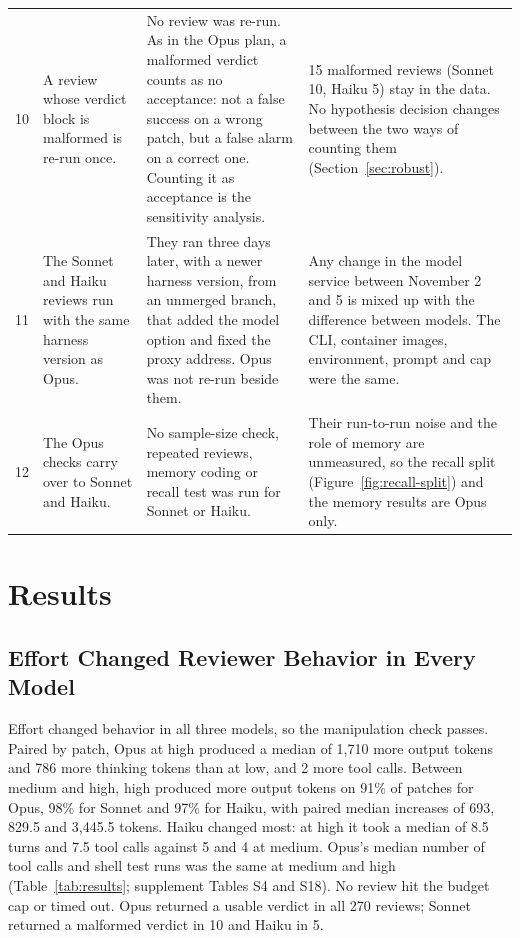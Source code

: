 \documentclass[sigconf,nonacm]{acmart}
\begin{document}
\begin{table}[t]
\begin{tabular}{@{}r L{0.26\textwidth} L{0.33\textwidth} L{0.32\textwidth}@{}}
10 & A review whose verdict block is malformed is re-run once. & No review was re-run. As in the Opus plan, a malformed verdict counts as no acceptance: not a false success on a wrong patch, but a false alarm on a correct one. Counting it as acceptance is the sensitivity analysis. & 15 malformed reviews (Sonnet 10, Haiku 5) stay in the data. No hypothesis decision changes between the two ways of counting them (Section~\ref{sec:robust}). \\
11 & The Sonnet and Haiku reviews run with the same harness version as Opus. & They ran three days later, with a newer harness version, from an unmerged branch, that added the model option and fixed the proxy address. Opus was not re-run beside them. & Any change in the model service between November 2 and 5 is mixed up with the difference between models. The CLI, container images, environment, prompt and cap were the same. \\
12 & The Opus checks carry over to Sonnet and Haiku. & No sample-size check, repeated reviews, memory coding or recall test was run for Sonnet or Haiku. & Their run-to-run noise and the role of memory are unmeasured, so the recall split (Figure~\ref{fig:recall-split}) and the memory results are Opus only. \\
\bottomrule
\end{tabular}
\end{table}

\section{Results}\label{sec:results}

\subsection{Effort Changed Reviewer Behavior in Every Model}\label{sec:behavior}

Effort changed behavior in all three models, so the manipulation check passes. Paired by patch, Opus at high produced a median of 1,710 more output tokens and 786 more thinking tokens than at low, and 2 more tool calls. Between medium and high, high produced more output tokens on 91\% of patches for Opus, 98\% for Sonnet and 97\% for Haiku, with paired median increases of 693, 829.5 and 3,445.5 tokens. Haiku changed most: at high it took a median of 8.5 turns and 7.5 tool calls against 5 and 4 at medium. Opus's median number of tool calls and shell test runs was the same at medium and high (Table~\ref{tab:results}; supplement Tables S4 and S18). No review hit the budget cap or timed out. Opus returned a usable verdict in all 270 reviews; Sonnet returned a malformed verdict in 10 and Haiku in 5.
\end{document}
